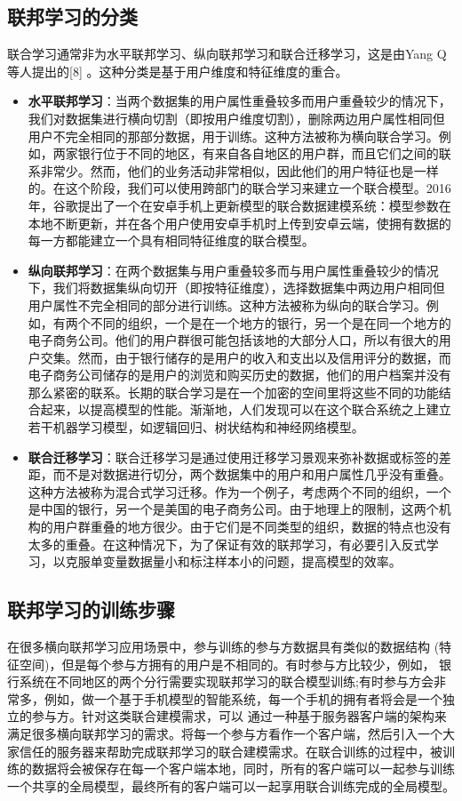 \subsection{联邦学习的分类}
联合学习通常非为水平联邦学习、纵向联邦学习和联合迁移学习，这是由Yang Q等人提出的[8] 。这种分类是基于用户维度和特征维度的重合。
\begin{itemize}
\item \textbf{水平联邦学习}：当两个数据集的用户属性重叠较多而用户重叠较少的情况下，我们对数据集进行横向切割（即按用户维度切割），删除两边用户属性相同但用户不完全相同的那部分数据，用于训练。这种方法被称为横向联合学习。例如，两家银行位于不同的地区，有来自各自地区的用户群，而且它们之间的联系非常少。然而，他们的业务活动非常相似，因此他们的用户特征也是一样的。在这个阶段，我们可以使用跨部门的联合学习来建立一个联合模型。2016年，谷歌提出了一个在安卓手机上更新模型的联合数据建模系统：模型参数在本地不断更新，并在各个用户使用安卓手机时上传到安卓云端，使拥有数据的每一方都能建立一个具有相同特征维度的联合模型。

\item \textbf{纵向联邦学习}：在两个数据集与用户重叠较多而与用户属性重叠较少的情况下，我们将数据集纵向切开（即按特征维度），选择数据集中两边用户相同但用户属性不完全相同的部分进行训练。这种方法被称为纵向的联合学习。例如，有两个不同的组织，一个是在一个地方的银行，另一个是在同一个地方的电子商务公司。他们的用户群很可能包括该地的大部分人口，所以有很大的用户交集。然而，由于银行储存的是用户的收入和支出以及信用评分的数据，而电子商务公司储存的是用户的浏览和购买历史的数据，他们的用户档案并没有那么紧密的联系。长期的联合学习是在一个加密的空间里将这些不同的功能结合起来，以提高模型的性能。渐渐地，人们发现可以在这个联合系统之上建立若干机器学习模型，如逻辑回归、树状结构和神经网络模型。

\item \textbf{联合迁移学习}：联合迁移学习是通过使用迁移学习景观来弥补数据或标签的差距，而不是对数据进行切分，两个数据集中的用户和用户属性几乎没有重叠。这种方法被称为混合式学习迁移。作为一个例子，考虑两个不同的组织，一个是中国的银行，另一个是美国的电子商务公司。由于地理上的限制，这两个机构的用户群重叠的地方很少。由于它们是不同类型的组织，数据的特点也没有太多的重叠。在这种情况下，为了保证有效的联邦学习，有必要引入反式学习，以克服单变量数据量小和标注样本小的问题，提高模型的效率。

\end{itemize}

\subsection{联邦学习的训练步骤}
在很多横向联邦学习应用场景中，参与训练的参与方数据具有类似的数据结构 (特征空间)，但是每个参与方拥有的用户是不相同的。有时参与方比较少，例如， 银行系统在不同地区的两个分行需要实现联邦学习的联合模型训练;有时参与方会非常多，例如，做一个基于手机模型的智能系统，每一个手机的拥有者将会是一个独立的参与方。针对这类联合建模需求，可以 通过一种基于服务器客户端的架构来满足很多横向联邦学习的需求。将每一个参与方看作一个客户端，然后引入一个大家信任的服务器来帮助完成联邦学习的联合建模需求。在联合训练的过程中，被训练的数据将会被保存在每一个客户端本地，同时，所有的客户端可以一起参与训练一个共享的全局模型，最终所有的客户端可以一起享用联合训练完成的全局模型。


